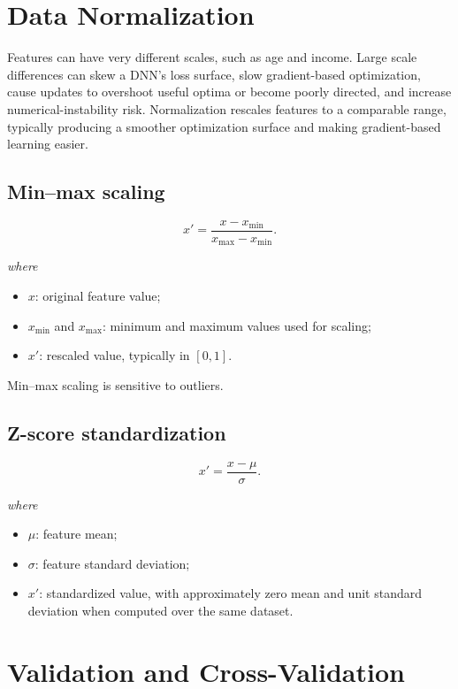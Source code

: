 \documentclass[11pt,a4paper]{report}
\newcommand{\wherelegend}{\par\smallskip\textit{where}\vspace{-0.3em}}
\begin{document}
\section{Data Normalization}

Features can have very different scales, such as age and income. Large scale differences can skew a DNN's loss surface, slow gradient-based optimization, cause updates to overshoot useful optima or become poorly directed, and increase numerical-instability risk. Normalization rescales features to a comparable range, typically producing a smoother optimization surface and making gradient-based learning easier.

\subsection{Min--max scaling}
\begin{equation}
  x' = \frac{x-x_{\min}}{x_{\max}-x_{\min}}.
  \label{eq:minmax}
\end{equation}
\wherelegend
\begin{itemize}
  \item $x$: original feature value;
  \item $x_{\min}$ and $x_{\max}$: minimum and maximum values used for scaling;
  \item $x'$: rescaled value, typically in $[0,1]$.
\end{itemize}
Min--max scaling is sensitive to outliers.

\subsection{Z-score standardization}
\begin{equation}
  x' = \frac{x-\mu}{\sigma}.
  \label{eq:zscore}
\end{equation}
\wherelegend
\begin{itemize}
  \item $\mu$: feature mean;
  \item $\sigma$: feature standard deviation;
  \item $x'$: standardized value, with approximately zero mean and unit standard deviation when computed over the same dataset.
\end{itemize}

\section{Validation and Cross-Validation}
\end{document}
